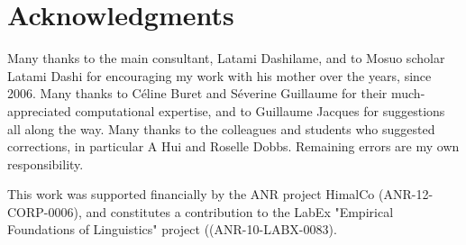 \documentclass[oldfontcommands,oneside,a4paper,11pt]{article}
\begin{document}
	
	\section{Acknowledgments} \label{sec:ackno}
	
	Many thanks to the main consultant, Latami Dashilame, and to Mosuo scholar Latami Dashi for encouraging my work with his mother over the years, since 2006. Many thanks to Céline Buret and Séverine Guillaume for their much-appreciated computational expertise, and to Guillaume Jacques for suggestions all along the way. Many thanks to the colleagues and students who suggested corrections, in particular A Hui and Roselle Dobbs. Remaining errors are my own responsibility. 
	
	This work was supported financially by the ANR project HimalCo (ANR-12-CORP-0006), and constitutes a contribution to the LabEx "Empirical Foundations of Linguistics" project ((ANR-10-LABX-0083).
	
\end{document}
